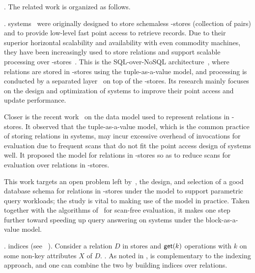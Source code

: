 \vspace{0.6ex}

. The related work is organized as follows.

.
\kv systems~\cite{AmazonKV, FacebookKV, cassandra, bigtable,
hbase, F1} were originally designed to store schemaless
\kv-stores (\ie collection of \kv pairs) and to provide low-level
fast point access to retrieve \kv records. Due to %
their
superior horizontal scalability and availability with even
commodity machines, they have been increasingly used to store
relations and support scalable \SQL processing over
\kv-stores~\cite{spanner1,spanner,myrocks}. This is
the SQL-over-NoSQL architecture~\cite{kvscan}, where relations
are stored in \kv-stores using the tuple-as-a-value model, and
\SQL processing is conducted by a separated \SQL
layer~\cite{cassandra,hive,phoenix,sparksql,drill,impala,kudu} on
top of the \kv-stores. Its research mainly focuses on the design
and optimization of \kv systems to improve their point access and
update performance.

Closer %
is the recent work~\cite{VLDB19} on the data model used to
represent relations in \kv-stores. It observed that the
tuple-as-a-value model, which is the common practice of storing
relations in \kv systems, may incur excessive overhead of \get
invocations for \SQL evaluation due to %
frequent %
scans
that do not fit  the point access design of \kv systems well.
It proposed the \baav model for relations in \kv-stores so as to
reduce scans for \SQL evaluation over relations in \kv-stores.

\vspace{0.6ex}
This work targets an open problem left by~\cite{VLDB19}, \ie
the design,  and
selection of a good database schema for relations in \kv-stores
under the \baav model to support parametric query workloads; the
study is vital to making 
use of the \baav model in practice.
Taken together with the algorithms of~\cite{VLDB19} for
scan-free evaluation, it makes one step further toward speeding
up \SQL query answering on \kv systems under the
block-as-a-value model.


.
 indices (see \eg~\cite{ChrysafisCDDEGG19}).
Consider a relation $D$ in \kv stores and
$\protect\mathsf{get}(k)$ operations with $k$ on some non-key attributes $X$ of
$D$. .
As noted in  \cite{VLDB19},
\baav is complementary to the indexing
approach, and one can combine the two by building indices over
\baav relations.

